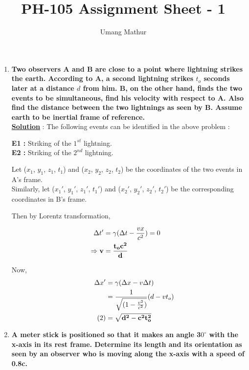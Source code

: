 \documentclass[10pt, a4paper]{article}
\begin{document}
\title{PH-105 Assignment Sheet - 1}
\date{}
\author{Umang Mathur}
\maketitle
\begin{enumerate}
\item {\bf Two observers A and B are close to a point where lightning strikes the earth. According to A, a second lightning strikes $t_{o}$ seconds later at a distance $d$ from him. B, on the other hand, finds the two events to be simultaneous, find his velocity with respect to A. Also find the distance between the two lightnings as seen by B. Assume earth to be inertial frame of reference.}\\

{\underline {\bf Solution}} : 
	The following events can be identified in the above problem :
	
	{\bf E1 :} Striking of the $1^{st}$ lightning.\\
	{\bf E2 :} Striking of the $2^{nd}$ lightning.
	
	Let ($x_{1}$, $y_{1}$, $z_{1}$, $t_{1}$) and ($x_{2}$, $y_{2}$, $z_{2}$, $t_{2}$) be the coordinates of the two events in A's frame.\\
	Similarly, let ($x_{1}'$, $y_{1}'$, $z_{1}'$, $t_{1}'$) and ($x_{2}'$, $y_{2}'$, $z_{2}'$, $t_{2}'$) be the corresponding coordinates in B's frame.
	
	Then by Lorentz transformation,
	
	\begin{align*}
		\Delta t' &= \gamma (\Delta t - \frac{vx}{c^{2}}) = 0 & \\
		\Rightarrow  {\bf v} &= {\bf \frac{t_{o}c^{2}}{d}}
	\end{align*}
    		 
 	Now,
 	\begin{align*}
	\Delta x' &= \gamma (\Delta x - v \Delta t)\\
	&= \frac{1}{\sqrt {(1 - \frac{v^{2}}{c^{2}})}} ( d - vt_{o} ) \\
	\tag{2}&= {\bf \sqrt {d^{2} - c^{2}t_{o}^{2} }}
	\end{align*}

\item {\bf A meter stick is positioned so that it makes an angle 3$0^{\circ}$ with the x-axis in its rest frame. Determine its length and its orientation as seen by an observer who is moving along the x-axis with a speed of 0.8c.} \\


\end{enumerate}
\end{document}
